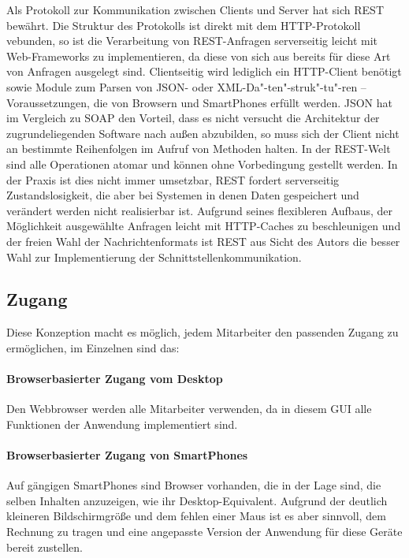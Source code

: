 Als Protokoll zur Kommunikation zwischen Clients und Server hat sich REST bewährt. Die Struktur des Protokolls ist direkt mit dem HTTP-Protokoll vebunden, so ist die Verarbeitung von REST-Anfragen serverseitig leicht mit Web-Frameworks zu implementieren, da diese von sich aus bereits für diese Art von Anfragen ausgelegt sind. Clientseitig wird lediglich ein HTTP-Client benötigt sowie Module zum Parsen von JSON- oder XML-Da"-ten"-struk"-tu"-ren -- Voraussetzungen, die von Browsern und SmartPhones erfüllt werden. JSON hat im Vergleich zu SOAP den Vorteil, dass es nicht versucht die Architektur der zugrundeliegenden Software nach außen abzubilden, so muss sich der Client nicht an bestimmte Reihenfolgen im Aufruf von Methoden halten. In der REST-Welt sind alle Operationen atomar und können ohne Vorbedingung gestellt werden. In der Praxis ist dies nicht immer umsetzbar, REST fordert serverseitig Zustandslosigkeit, die aber bei Systemen in denen Daten gespeichert und verändert werden nicht realisierbar ist. Aufgrund seines flexibleren Aufbaus, der Möglichkeit ausgewählte Anfragen leicht mit HTTP-Caches zu beschleunigen und der freien Wahl der Nachrichtenformats ist REST aus Sicht des Autors die besser Wahl zur Implementierung der Schnittstellenkommunikation.

\subsection{Zugang}

Diese Konzeption macht es möglich, jedem Mitarbeiter den passenden Zugang zu ermöglichen, im Einzelnen sind das:

\paragraph{Browserbasierter Zugang vom Desktop} Den Webbrowser werden alle Mitarbeiter verwenden, da in diesem GUI alle Funktionen der Anwendung implementiert sind.

\paragraph{Browserbasierter Zugang von SmartPhones} Auf gängigen SmartPhones sind Browser vorhanden, die in der Lage sind, die selben Inhalten anzuzeigen, wie ihr Desktop-Equivalent. Aufgrund der deutlich kleineren Bildschirmgröße und dem fehlen einer Maus ist es aber sinnvoll, dem Rechnung zu tragen und eine angepasste Version der Anwendung für diese Geräte bereit zustellen. 

